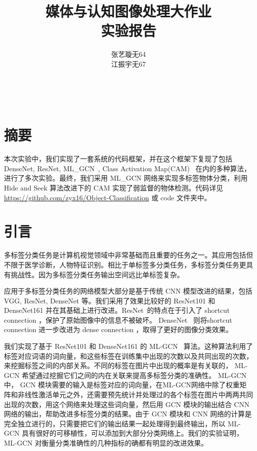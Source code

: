 \documentclass[a4paper]{ctexart}
\begin{document}
\begin{titlepage}
    \centering
    \title{媒体与认知图像处理大作业\\实验报告}
    \maketitle
    \author{张艺璇\quad 无64\\江振宇\quad 无67}
    \\
\end{titlepage}

\section{摘要}
本次实验中，我们实现了一套系统的代码框架，并在这个框架下复现了包括 DenseNet, ResNet, ML\_GCN~\cite{ML_GCN_CVPR_2019}, Class Activation Map(CAM)~\cite{zhou2016learning} 在内的多种算法，进行了多次实验。最终，我们采用 ML\_GCN 网络来实现多标签物体分类，利用 Hide and Seek 算法改进下的 CAM 实现了弱监督的物体检测。代码详见 \url{https://github.com/zyx16/Object-Classification} 或 code 文件夹中。


\section{引言}
多标签分类任务是计算机视觉领域中非常基础而且重要的任务之一。其应用包括但不限于医学诊断，人物特征识别。相比于单标签多分类任务，多标签分类任务更具有挑战性。因为多标签分类任务输出空间远比单标签复杂。

应用于多标签分类任务的网络模型大部分是基于传统 CNN 模型改进的结果，包括 VGG, ResNet, DenseNet 等。我们采用了效果比较好的 ResNet101 和 DenseNet161 并在其基础上进行改进。ResNet~\cite{he2016deep}的特点在于引入了 shortcut connection ，保护了原始图像中的信息不被破坏。 DenseNet~\cite{huang2017densely} 则将shortcut connection 进一步改进为 dense connection ，取得了更好的图像分类效果。

我们实现了基于 ResNet101 和 DenseNet161 的 ML-GCN~\cite{ML_GCN_CVPR_2019} 算法。这种算法利用了标签对应词语的词向量，和这些标签在训练集中出现的次数以及共同出现的次数，来挖掘标签之间的内部关系。不同的标签在图片中出现的概率是有关联的， ML-GCN 希望通过挖掘它们之间的内在关联来提高多标签分类的准确性。 ML-GCN 中， GCN 模块需要的输入是标签对应的词向量，在ML-GCN网络中除了权重矩阵和非线性激活单元之外，还需要预先统计并处理过的各个标签在图片中两两共同出现的次数，用这个网络来处理这些词向量，然后用 GCN 模块的输出结合 CNN 网络的输出，帮助改进多标签分类的结果。由于 GCN 模块和 CNN 网络的计算是完全独立进行的，只需要把它们的输出结果一起处理得到最终输出，所以 ML-GCN 具有很好的可移植性，可以添加到大部分分类网络上。我们的实验证明， ML-GCN 对衡量分类准确性的几种指标的确都有明显的改进效果。
\end{document}
